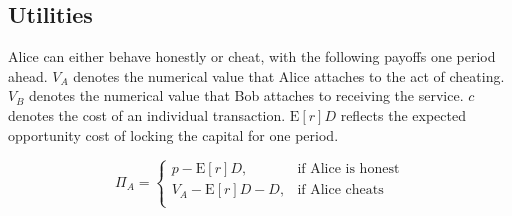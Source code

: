 \documentclass[runningheads]{llncs}
\newcommand{\sys}{Promise\xspace}
\newcommand{\rk}[1]{\todo[linecolor=red,backgroundcolor=red!25,bordercolor=blue,inline,caption={}]{Comment by Rami: #1}}
\newcommand{\dom}[1]{\todo[linecolor=green,backgroundcolor=green!25,bordercolor=green,inline,caption={}]{Comment by Dominik: #1}}
\begin{document}



\subsection{Utilities}
Alice can either behave honestly or cheat, with the following payoffs one period ahead.
$V_A$ denotes the numerical value that Alice attaches to the act of cheating.
$V_B$ denotes the numerical value that Bob attaches to receiving the service.
$c$ denotes the cost of an individual transaction. 
$\mathrm{E}[r]D$ reflects the expected opportunity cost of locking the capital for one period. %


\begin{equation}
\label{eq:status-quo_alice}
\Pi_A = 
\begin{cases}
    p - \mathrm{E}[r]D, & \text{if Alice is honest} \\
    V_A - \mathrm{E}[r]D-D, & \text{if Alice cheats} \\
\end{cases}
\end{equation}

\end{document}
